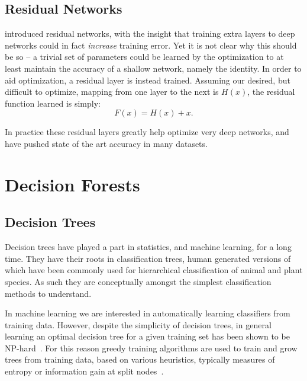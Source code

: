 \documentclass[thesis]{subfiles}
\begin{document}

\subsection{Residual Networks}
\citet{He2015} introduced residual networks, with the insight that training extra layers to deep networks could in fact \emph{increase} training error. Yet it is not clear why this should be so -- a trivial set of parameters could be learned by the optimization to at least maintain the accuracy of a shallow network, namely the identity. In order to aid optimization, a residual layer is instead trained. Assuming our desired, but difficult to optimize, mapping from one layer to the next is $H(x)$, the residual function learned is simply:
\begin{equation}
	F(x) = H(x) + x.
\end{equation}

In practice these residual layers greatly help optimize very deep networks, and have pushed state of the art accuracy in many datasets.

\section{Decision Forests}
\subsection{Decision Trees}
Decision trees have played a part in statistics, and machine learning, for a long time. They have their roots in classification trees, human generated versions of which have been commonly used for hierarchical classification of animal and plant species. As such they are conceptually amongst the simplest classification methods to understand. 

In machine learning we are interested in automatically learning classifiers from training data. However, despite the simplicity of decision trees, in general learning an optimal decision tree for a given training set has been shown to be NP-hard~\citep{journals/iandc/HancockJLT96}. For this reason greedy training algorithms are used to train and grow trees from training data, based on various heuristics, typically measures of entropy or information gain at split nodes~\citep{breiman84}. 
\end{document}
